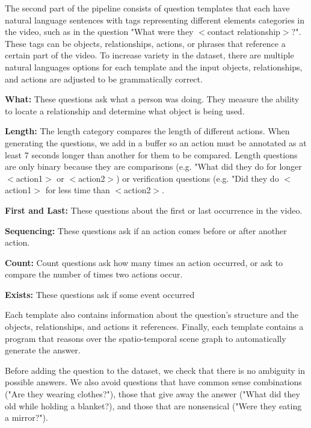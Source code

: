\documentclass[10pt,twocolumn,letterpaper]{article}
\newcommand{\mgm}[1]{{\color{cyan}{mgm: #1}}}
\begin{document}
The second part of the pipeline consists of question templates that each have natural language sentences with tags representing different elements categories in the video, such as in the question "What were they $<$contact relationship$>$?". These tags can be objects, relationships, actions, or phrases that reference a certain part of the video. To increase variety in the dataset, there are multiple natural languages options for each template and the input objects, relationships, and actions are adjusted to be grammatically correct.

\mgm{Moved form experiments section, since we want to talk about diversity in reasoning here}
\textbf{What: } These questions ask what a person was doing. They measure the ability to locate a relationship and determine what object is being used. \mgm{this expl will change if we add in actions}

\textbf{Length: } The length category compares the length of different actions. When generating the questions, we add in a buffer so an action must be annotated as at least 7 seconds longer than another for them to be compared. Length questions are only binary because they are comparisons (e.g. "What did they do for longer $<$action1$>$ or $<$action2$>$) or verification questions (e.g. "Did they do $<$action1$>$ for less time than $<$action2$>$.

\textbf{First and Last: } These questions about the first or last occurrence in the video. 


\textbf{Sequencing: } These questions ask if an action comes before or after another action.

\textbf{Count: } Count questions ask how many times an action occurred, or ask to compare the number of times two actions occur.

\textbf{Exists: } These questions ask if some event occurred



Each template also contains information about the question's structure and the objects, relationships, and actions it references. Finally, each template contains a program that reasons over the spatio-temporal scene graph to automatically generate the answer.

Before adding the question to the dataset, we check that there is no ambiguity in possible answers. We also avoid questions that have common sense combinations ("Are they wearing clothes?"), those that give away the answer ("What did they old while holding a blanket?), and those that are nonsensical ("Were they eating a mirror?").
\end{document}
